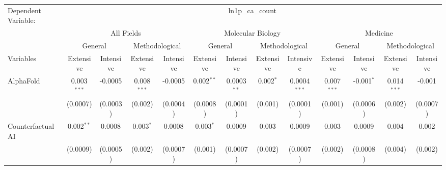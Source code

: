 \begingroup
\centering
\begin{tabular}{lcccccccccccc}
   \tabularnewline \midrule \midrule
   Dependent Variable: & \multicolumn{12}{c}{ln1p\_ca\_count}\\
 & \multicolumn{4}{c}{All Fields} & \multicolumn{4}{c}{Molecular Biology} & \multicolumn{4}{c}{Medicine} \\
\cmidrule(lr){2-5} \cmidrule(lr){6-9} \cmidrule(lr){10-13}
 & \multicolumn{2}{c}{General} & \multicolumn{2}{c}{Methodological} & \multicolumn{2}{c}{General} & \multicolumn{2}{c}{Methodological} & \multicolumn{2}{c}{General} & \multicolumn{2}{c}{Methodological} \\
\cmidrule(lr){2-3} \cmidrule(lr){4-5} \cmidrule(lr){6-7} \cmidrule(lr){8-9} \cmidrule(lr){10-11} \cmidrule(lr){12-13}
Variables & \multicolumn{1}{c}{Extensive} & \multicolumn{1}{c}{Intensive} & \multicolumn{1}{c}{Extensive} & \multicolumn{1}{c}{Intensive} & \multicolumn{1}{c}{Extensive} & \multicolumn{1}{c}{Intensive} & \multicolumn{1}{c}{Extensive} & \multicolumn{1}{c}{Intensive} & \multicolumn{1}{c}{Extensive} & \multicolumn{1}{c}{Intensive} & \multicolumn{1}{c}{Extensive} & \multicolumn{1}{c}{Intensive} \\
\cmidrule(lr){1-1}\cmidrule(lr){2-2} \cmidrule(lr){3-3} \cmidrule(lr){4-4} \cmidrule(lr){5-5} \cmidrule(lr){6-6} \cmidrule(lr){7-7} \cmidrule(lr){8-8} \cmidrule(lr){9-9} \cmidrule(lr){10-10} \cmidrule(lr){11-11} \cmidrule(lr){12-12} \cmidrule(lr){13-13}
   AlphaFold                                & 0.003$^{***}$ & -0.0005         & 0.008$^{***}$ & -0.0005         & 0.002$^{**}$ & 0.0003$^{**}$ & 0.002$^{*}$ & 0.0004$^{***}$ & 0.007$^{***}$ & -0.001$^{*}$   & 0.014$^{***}$ & -0.001\\   
                                            & (0.0007)      & (0.0003)        & (0.002)       & (0.0004)        & (0.0008)     & (0.0001)      & (0.001)     & (0.0001)       & (0.001)       & (0.0006)       & (0.002)       & (0.0007)\\   
   Counterfactual AI                        & 0.002$^{**}$  & 0.0008          & 0.003$^{*}$   & 0.0008          & 0.003$^{*}$  & 0.0009        & 0.003       & 0.0009         & 0.003         & 0.0009         & 0.004         & 0.002\\   
                                            & (0.0009)      & (0.0005)        & (0.002)       & (0.0007)        & (0.001)      & (0.0007)      & (0.002)     & (0.0007)       & (0.002)       & (0.0008)       & (0.004)       & (0.002)\\   

\end{tabular}
